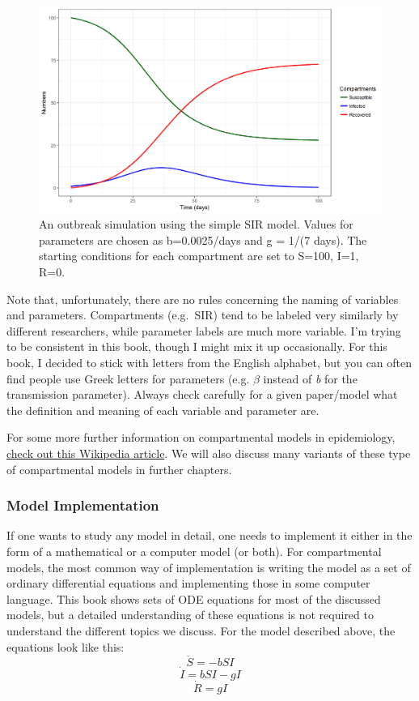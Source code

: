 \documentclass[]{book}
\theoremstyle{definition}
\theoremstyle{definition}
\theoremstyle{definition}
\theoremstyle{remark}
\begin{document}
\begin{figure}
\centering
\includegraphics{./images/sirsim.png}
\caption{\label{fig:sirsim}An outbreak simulation using the simple SIR
model. Values for parameters are chosen as b=0.0025/days and g = 1/(7
days). The starting conditions for each compartment are set to S=100,
I=1, R=0.}
\end{figure}

Note that, unfortunately, there are no rules concerning the naming of
variables and parameters. Compartments (e.g.~SIR) tend to be labeled
very similarly by different researchers, while parameter labels are much
more variable. I'm trying to be consistent in this book, though I might
mix it up occasionally. For this book, I decided to stick with letters
from the English alphabet, but you can often find people use Greek
letters for parameters (e.g. \(\beta\) instead of \emph{b} for the
transmission parameter). Always check carefully for a given paper/model
what the definition and meaning of each variable and parameter are.

For some more further information on compartmental models in
epidemiology,
\href{https://en.wikipedia.org/wiki/Compartmental_models_in_epidemiology}{check
out this Wikipedia article}. We will also discuss many variants of these
type of compartmental models in further chapters.

\subsubsection{Model Implementation}\label{myadvancedbox}

If one wants to study any model in detail, one needs to implement it
either in the form of a mathematical or a computer model (or both). For
compartmental models, the most common way of implementation is writing
the model as a set of ordinary differential equations and implementing
those in some computer language. This book shows sets of ODE equations
for most of the discussed models, but a detailed understanding of these
equations is not required to understand the different topics we discuss.
For the model described above, the equations look like this:
\[\dot S = -bSI\] \[\dot I = bSI - gI\] \[\dot R = gI\]
\end{document}
